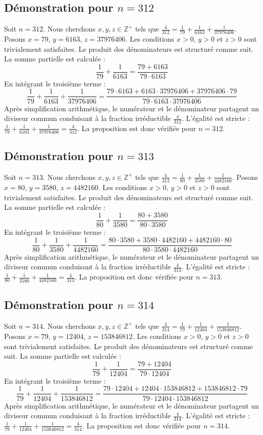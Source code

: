 \documentclass[11pt,a4paper]{article}
\begin{document}
\subsection{Démonstration pour $n = 312$}
Soit $n = 312$. Nous cherchons $x, y, z \in \mathbb{Z}^{+}$ tels que $\frac{4}{312} = \frac{1}{79} + \frac{1}{6163} + \frac{1}{37976406}$.
Posons $x = 79$, $y = 6163$, $z = 37976406$.
Les conditions $x > 0$, $y > 0$ et $z > 0$ sont trivialement satisfaites.
Le produit des dénominateurs est structuré comme suit. La somme partielle est calculée :
$$ \frac{1}{79} + \frac{1}{6163} = \frac{79+6163}{79 \cdot 6163} $$
En intégrant le troisième terme :
$$ \frac{1}{79} + \frac{1}{6163} + \frac{1}{37976406} = \frac{79 \cdot 6163 + 6163 \cdot 37976406 + 37976406 \cdot 79}{79 \cdot 6163 \cdot 37976406} $$
Après simplification arithmétique, le numérateur et le dénominateur partagent un diviseur commun conduisant à la fraction irréductible $\frac{4}{312}$.
L'égalité est stricte : $\frac{1}{79} + \frac{1}{6163} + \frac{1}{37976406} = \frac{4}{312}$.
La proposition est donc vérifiée pour $n = 312$.
\subsection{Démonstration pour $n = 313$}
Soit $n = 313$. Nous cherchons $x, y, z \in \mathbb{Z}^{+}$ tels que $\frac{4}{313} = \frac{1}{80} + \frac{1}{3580} + \frac{1}{4482160}$.
Posons $x = 80$, $y = 3580$, $z = 4482160$.
Les conditions $x > 0$, $y > 0$ et $z > 0$ sont trivialement satisfaites.
Le produit des dénominateurs est structuré comme suit. La somme partielle est calculée :
$$ \frac{1}{80} + \frac{1}{3580} = \frac{80+3580}{80 \cdot 3580} $$
En intégrant le troisième terme :
$$ \frac{1}{80} + \frac{1}{3580} + \frac{1}{4482160} = \frac{80 \cdot 3580 + 3580 \cdot 4482160 + 4482160 \cdot 80}{80 \cdot 3580 \cdot 4482160} $$
Après simplification arithmétique, le numérateur et le dénominateur partagent un diviseur commun conduisant à la fraction irréductible $\frac{4}{313}$.
L'égalité est stricte : $\frac{1}{80} + \frac{1}{3580} + \frac{1}{4482160} = \frac{4}{313}$.
La proposition est donc vérifiée pour $n = 313$.
\subsection{Démonstration pour $n = 314$}
Soit $n = 314$. Nous cherchons $x, y, z \in \mathbb{Z}^{+}$ tels que $\frac{4}{314} = \frac{1}{79} + \frac{1}{12404} + \frac{1}{153846812}$.
Posons $x = 79$, $y = 12404$, $z = 153846812$.
Les conditions $x > 0$, $y > 0$ et $z > 0$ sont trivialement satisfaites.
Le produit des dénominateurs est structuré comme suit. La somme partielle est calculée :
$$ \frac{1}{79} + \frac{1}{12404} = \frac{79+12404}{79 \cdot 12404} $$
En intégrant le troisième terme :
$$ \frac{1}{79} + \frac{1}{12404} + \frac{1}{153846812} = \frac{79 \cdot 12404 + 12404 \cdot 153846812 + 153846812 \cdot 79}{79 \cdot 12404 \cdot 153846812} $$
Après simplification arithmétique, le numérateur et le dénominateur partagent un diviseur commun conduisant à la fraction irréductible $\frac{4}{314}$.
L'égalité est stricte : $\frac{1}{79} + \frac{1}{12404} + \frac{1}{153846812} = \frac{4}{314}$.
La proposition est donc vérifiée pour $n = 314$.
\end{document}

